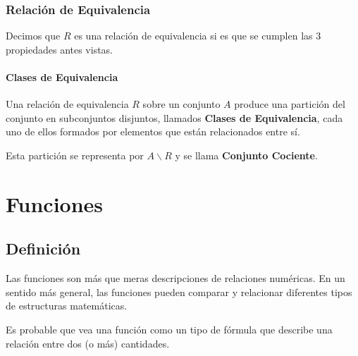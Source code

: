 \documentclass[12pt]{report}                                    %
\begin{document}
            \subsection{Relación de Equivalencia}
                Decimos que $R$ es una relación de equivalencia si es que se cumplen las 3 propiedades antes vistas.


            \subsubsection{Clases de Equivalencia}

                Una relación de equivalencia $R$ sobre un conjunto $A$ produce una partición
                del conjunto en subconjuntos disjuntos, llamados \textbf{Clases de
                Equivalencia}, cada uno de ellos formados por elementos que están
                relacionados entre sí.

                Esta partición se representa por $A \backslash R$ y se llama
                \textbf{Conjunto Cociente}.






    \chapter{Funciones}
        \clearpage    



        \section{Definición}

            Las funciones son más que meras descripciones de relaciones numéricas. En un sentido más general,
            las funciones pueden comparar y relacionar diferentes tipos de estructuras matemáticas.

            Es probable que vea una función como un tipo de fórmula que describe una relación entre dos
            (o más) cantidades.
\end{document}
